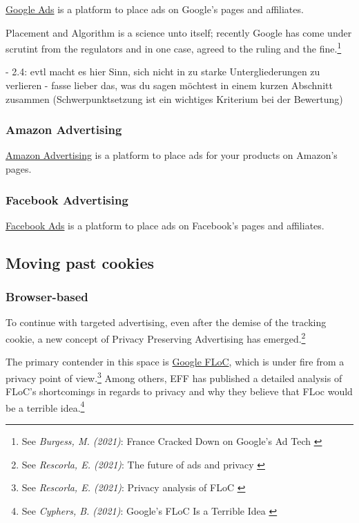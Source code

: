 \href{https://ads.google.com/home/}{Google Ads} is a platform to place ads on Google's pages and affiliates.

Placement and Algorithm is a science unto itself; recently Google has come under scrutint from the regulators and in one case, agreed to the ruling and the fine.\footnote{See \textit{Burgess, M. (2021)}: France Cracked Down on Google’s Ad Tech \cite{googleAds}}

- 2.4: evtl macht es hier Sinn, sich nicht in zu starke Untergliederungen zu verlieren - fasse lieber das, was du sagen möchtest in einem kurzen Abschnitt zusammen (Schwerpunktsetzung ist ein wichtiges Kriterium bei der Bewertung)

\subsubsection{Amazon Advertising}

\href{https://advertising.amazon.com//}{Amazon Advertising} is a platform to place ads for your products on Amazon's pages.

\subsubsection{Facebook Advertising}

\href{https://www.facebook.com/business/ads}{Facebook Ads} is a platform to place ads on Facebook's pages and affiliates.

\subsection{Moving past cookies}

\subsubsection{Browser-based}

To continue with targeted advertising, even after the demise of the tracking cookie, a new concept of Privacy Preserving Advertising has emerged.\footnote{See \textit{Rescorla, E. (2021)}: The future of ads and privacy \cite{futureAds}}

The primary contender in this space is \href{https://wicg.github.io/floc/}{Google FLoC}, which is under fire from a privacy point of view.\footnote{See \textit{Rescorla, E. (2021)}: Privacy analysis of FLoC \cite{privacyFloc}} Among others, EFF has published a detailed analysis of FLoC's shortcomings in regards to privacy and why they believe that FLoc would be a terrible idea.\footnote{See \textit{Cyphers, B. (2021)}: Google’s FLoC Is a Terrible Idea \cite{terribleIdea}}

